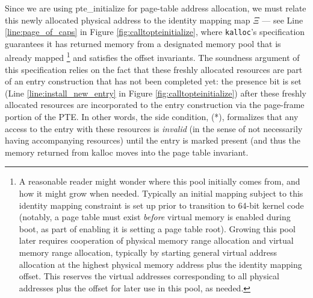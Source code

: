 Since we are using \textsf{pte\_initialize} for page-table address allocation, we must relate this newly
allocated physical address to the identity mapping map $\Xi$ --- 
see Line \ref{line:page_of_caps} in Figure \ref{fig:calltopteinitialize}, where
\texttt{kalloc}'s specification guarantees it has returned memory from a designated memory
pool that is already mapped
\ifPLDI
\else
\footnote{A reasonable reader might wonder where this pool
initially comes from, and how it might grow when needed. Typically an initial mapping subject to this identity mapping
constraint is set up prior to transition to 64-bit kernel code (notably,
a page table must exist \emph{before} virtual memory is enabled during boot, as part of enabling it is setting
a page table root).
Growing this pool later requires cooperation of physical memory range allocation and virtual memory range allocation,
typically by starting general virtual address allocation at the highest physical memory address plus the identity mapping offset.
This reserves the virtual addresses corresponding to all physical addresses plus the offset for later use in this pool,
as needed.
} 
\fi
and satisfies the offset invariants.
The soundness argument of this specification relies on the fact that these freshly allocated resources are part 
of an entry construction that has not been completed yet: the presence bit is set 
(Line \ref{line:install_new_entry} in Figure \ref{fig:calltopteinitialize}) after these freshly allocated resources are incorporated to the 
entry construction via the page-frame portion of the PTE. In other words, the side condition, (*),
 formalizes that any access to the entry with these resources is \textit{invalid} (in the sense of not necessarily
having accompanying resources) until the entry is marked present (and thus the memory returned from \textsf{kalloc}
moves into the page table invariant.

